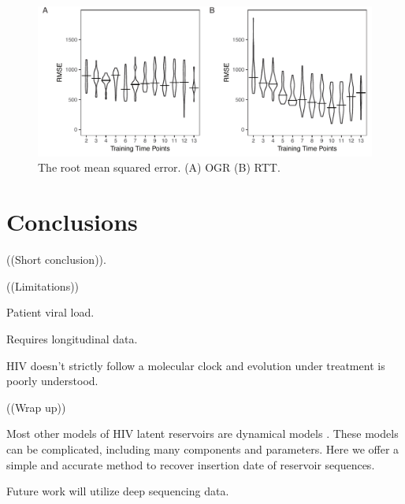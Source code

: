 \documentclass[12pt,onecolumn,twoside]{pnas-new}
\begin{document}
\begin{figure}
\includegraphics{sensitivity}
\caption{The root mean squared error.
(A) OGR (B) RTT.}
\label{fig:sensrmse}
\end{figure}

\section*{Conclusions}
((Short conclusion)).

((Limitations))

Patient viral load.

Requires longitudinal data.

HIV doesn't strictly follow a molecular clock and evolution under treatment is poorly understood.

((Wrap up))

Most other models of HIV latent reservoirs are dynamical models \cite{Rong09,Pace11}.
These models can be complicated, including many components and parameters.
Here we offer a simple and accurate method to recover insertion date of reservoir sequences.

Future work will utilize deep sequencing data.
\end{document}
